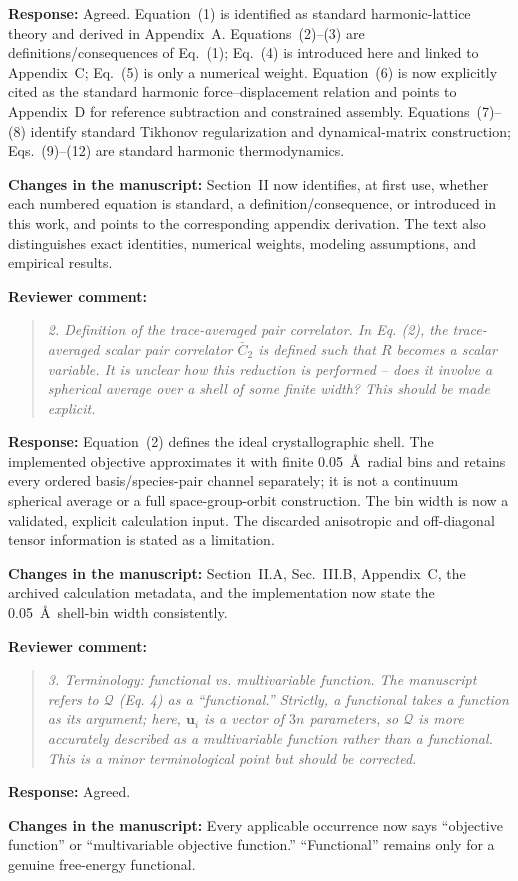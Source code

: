 \documentclass[11pt]{article}
\newcommand{\Question}[1]{\par\medskip\noindent\textbf{Reviewer comment:}\par\begin{quote}\itshape #1\end{quote}}
\newcommand{\Answer}[1]{\par\noindent\color{black}\normalfont\textbf{Response:} #1\par\smallskip}
\newcommand{\Change}[1]{\par\noindent\color{revisionblue}\normalfont\textbf{Changes in the manuscript:} #1\par\color{black}\medskip}
\begin{document}
\Answer{Agreed. Equation~(1) is identified as standard harmonic-lattice theory
and derived in Appendix~A. Equations~(2)--(3) are definitions/consequences of
Eq.~(1); Eq.~(4) is introduced here and linked to Appendix~C; Eq.~(5) is only a
numerical weight. Equation~(6) is now explicitly cited as the standard harmonic
force--displacement relation and points to Appendix~D for reference subtraction
and constrained assembly. Equations~(7)--(8) identify standard Tikhonov
regularization and dynamical-matrix construction; Eqs.~(9)--(12) are standard
harmonic thermodynamics.}

\Change{Section~II now identifies, at first use, whether each numbered equation is standard, a definition/consequence, or introduced in this work, and points to the corresponding appendix derivation. The text also distinguishes exact identities, numerical weights, modeling assumptions, and empirical results.}

\Question{2. Definition of the trace-averaged pair correlator. In Eq. (2), the trace-averaged scalar pair correlator $\bar{C}_2$ is defined such that $R$ becomes a scalar variable. It is unclear how this reduction is performed -- does it involve a spherical average over a shell of some finite width? This should be made explicit.}

\Answer{Equation~(2) defines the ideal crystallographic shell. The implemented
objective approximates it with finite 0.05~\AA\ radial bins and retains every
ordered basis/species-pair channel separately; it is not a continuum spherical
average or a full space-group-orbit construction. The bin width is now a
validated, explicit calculation input. The discarded anisotropic and
off-diagonal tensor information is stated as a limitation.}

\Change{Section~II.A, Sec.~III.B, Appendix~C, the archived calculation metadata,
and the implementation now state the 0.05~\AA\ shell-bin width consistently.}

\Question{3. Terminology: functional vs. multivariable function. The manuscript refers to $\mathcal{Q}$ (Eq. 4) as a \textquotedblleft{}functional.'' Strictly, a functional takes a function as its argument; here, $\mathbf{u}_i$ is a vector of $3n$ parameters, so $\mathcal{Q}$ is more accurately described as a multivariable function rather than a functional. This is a minor terminological point but should be corrected.}

\Answer{Agreed.}

\Change{Every applicable occurrence now says ``objective function'' or ``multivariable objective function.'' ``Functional'' remains only for a genuine free-energy functional.}
\end{document}
